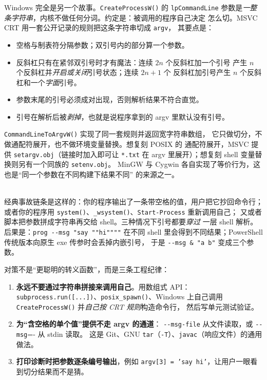 \documentclass[12pt,a4paper,fontset=fandol]{ctexbook}
\newcommand{\Fn}[1]{\texttt{#1()}}
\newcommand{\Tp}[1]{\texttt{#1}}
\newcommand{\Opt}[1]{\texttt{-\/-#1}}
\begin{document}
Windows 完全是另一个故事。\Fn{CreateProcessW} 的 \Tp{lpCommandLine}
参数是\emph{一整条字符串}，内核不做任何分词。约定是：被调用的程序自己决定
怎么切。MSVC CRT 用一套公开记录的规则把这条字符串切成 \Tp{argv}，
其要点是：

\begin{itemize}
\item 空格与制表符分隔参数；双引号内的部分算一个参数。
\item 反斜杠只有在紧邻双引号时才有魔法：连续 \(2n\) 个反斜杠加一个引号
      产生 \(n\) 个反斜杠并\emph{开启或关闭}引号状态；连续 \(2n+1\) 个
      反斜杠加引号产生 \(n\) 个反斜杠和一个\emph{字面}引号。
\item 参数末尾的引号必须成对出现，否则解析结果不符合直觉。
\item 引号在解析后被\emph{剥掉}，也就是说程序拿到的 argv 里默认没有引号。
\end{itemize}

\Fn{CommandLineToArgvW} 实现了同一套规则并返回宽字符串数组，
它只做切分，不做通配符展开，也不做环境变量替换。想复刻 POSIX 的
通配符展开，MSVC 提供 \Tp{setargv.obj}（链接时加入即可让 \Tp{*.txt}
在 argv 里展开）；想复刻 shell 变量替换则另有一个同族的 \Tp{setenv.obj}。
MinGW 与 Cygwin 各自实现了等价行为，这也是``同一个参数在不同构建下结果不同''
的来源之一。

\begin{warning}[title={参数里带引号就散架}]\mbox{}\\
经典事故链条是这样的：你的程序输出了一条带空格的值，用户把它抄回命令行；
或者你的程序用 \Fn{system}、\Fn{\_wsystem}、\Tp{Start-Process} 重新调用自己；
又或者脚本把参数拼成字符串再交给 shell。三种情况下引号都要\emph{穿过}
一层 shell 解析。后果是：\lstinline|prog --msg "say ""hi""""| 在不同 shell
里会得到不同结果；PowerShell 传统版本向原生 exe 传参时会丢掉内嵌引号，
于是 \lstinline|--msg & "a b"| 变成三个参数。
\end{warning}

对策不是``更聪明的转义函数''，而是三条工程纪律：

\begin{enumerate}
\item \textbf{永远不要通过字符串拼接来调用自己}。用数组式 API：
      \Tp{subprocess.run([...])}、\Fn{posix\_spawn}、Windows 上自己调用
      \Fn{CreateProcessW} 并\emph{自己按 CRT 规则}构造命令行，
      然后写单元测试验证。
\item \textbf{为``含空格的单个值''提供不走 argv 的通道}：
      \Opt{msg-file} 从文件读取，或 \Opt{msg}=- 从 stdin 读取。
      这是 Git、GNU \Tp{tar}（\Tp{-T}）、\Tp{javac}（响应文件）的通用做法。
\item \textbf{打印诊断时把参数逐条编号输出}，例如
      \Tp{argv[3] = 'say hi'}，让用户一眼看到切分结果而不是猜。
\end{enumerate}
\end{document}
